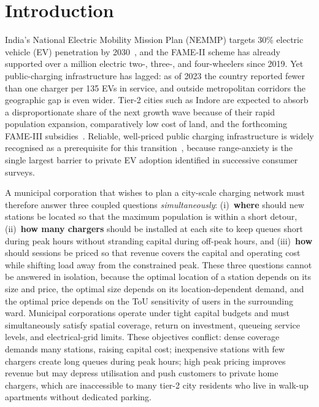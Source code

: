 \documentclass[conference]{IEEEtran}
\begin{document}
\section{Introduction}
\label{sec:intro}
India's National Electric Mobility Mission Plan (NEMMP) targets
30\% electric vehicle (EV) penetration by 2030~\cite{ref_nemmp},
and the FAME-II scheme has already supported over a million
electric two-, three-, and four-wheelers since 2019. Yet
public-charging infrastructure has
lagged: as of 2023 the country reported fewer than one charger per
135 EVs in service, and outside metropolitan corridors the
geographic gap is even wider. Tier-2 cities such as Indore are
expected to absorb a disproportionate share of the next growth wave
because of their rapid population expansion, comparatively low
cost of land, and the forthcoming FAME-III
subsidies~\cite{ref_indore_smart}. Reliable, well-priced public
charging infrastructure is widely recognised as a prerequisite for
this transition~\cite{ref_ev_planning_review,ref_ev_2026},
because range-anxiety is the single largest barrier to private EV
adoption identified in successive consumer surveys.

A municipal corporation that wishes to plan a city-scale charging
network must therefore answer three coupled questions
\emph{simultaneously}: (i)~\textbf{where} should new stations be
located so that the maximum population is within a short detour,
(ii)~\textbf{how many chargers} should be installed at each site
to keep queues short during peak hours without stranding capital
during off-peak hours, and (iii)~\textbf{how} should sessions be
priced so that revenue covers the capital and operating cost while
shifting load away from the constrained peak. These three questions
cannot be answered in isolation, because the optimal location of a
station depends on its size and price, the optimal size depends on
its location-dependent demand, and the optimal price depends on the
ToU sensitivity of users in the surrounding ward. Municipal
corporations operate under tight capital budgets and must
simultaneously satisfy spatial coverage, return on investment,
queueing service levels, and electrical-grid limits. These
objectives conflict: dense coverage demands many stations, raising
capital cost; inexpensive stations with few chargers create long
queues during peak hours; high peak pricing improves revenue but
may depress utilisation and push customers to private home
chargers, which are inaccessible to many tier-2 city residents who
live in walk-up apartments without dedicated parking.
\end{document}
